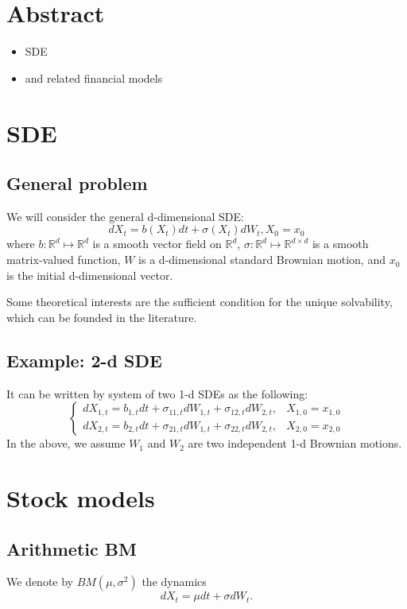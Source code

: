 \documentclass{article}
\begin{document}
\section{Abstract}
\begin{itemize}
 \item SDE 
 \item and related financial models
\end{itemize}


\section{SDE}
\subsection{General problem}
We will consider the general d-dimensional SDE:
$$d X_{t} = b(X_{t}) dt + \sigma(X_{t}) dW_{t}, X_{0} = x_{0}$$
where $b: \mathbb R^{d} \mapsto \mathbb R^{d}$ is a smooth 
vector field  on  $\mathbb R^{d}$,
$\sigma: \mathbb R^{d} \mapsto \mathbb R^{d\times d}$ is a smooth 
matrix-valued function, $W$ is a d-dimensional standard Brownian motion, 
and $x_{0}$ is the initial d-dimensional vector. 


Some theoretical interests are the sufficient condition for the unique solvability, which can be founded in the literature.


\subsection{Example: 2-d SDE}
It can be written by system of two 1-d SDEs as the following:
$$
\left\{
\begin{array}
 {ll}
 d X_{1,t} = b_{1,t} dt + \sigma_{11,t}dW_{1,t} + \sigma_{12,t} dW_{2,t}, 
 & X_{1,0} = x_{1,0}\\
 d X_{2,t} = b_{2,t} dt + \sigma_{21,t}dW_{1,t} + \sigma_{22,t} dW_{2,t}, 
 & X_{2,0} = x_{2,0}
\end{array}
\right.
$$
In the above, we assume $W_{1}$ and $W_{2}$ are two independent 1-d Brownian motions.


\section{Stock models}

\subsection{Arithmetic BM}
We denote by $BM(\mu, \sigma^2)$ the dynamics
$$d X_t = \mu dt + \sigma dW_t.$$
\end{document}

